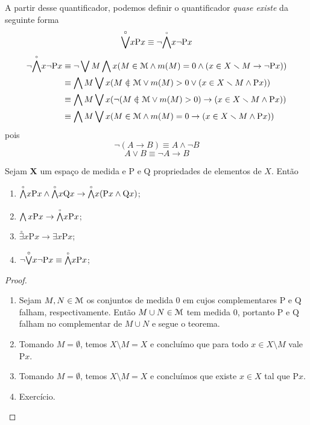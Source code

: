 A partir desse quantificador, podemos definir o quantificador \emph{quase existe} da seguinte forma
	\begin{equation*}
	\overset{\circ}{\exists}x \mathrm{P}x \equiv \neg \qforall x \neg \mathrm{P}x
	\end{equation*}
	\begin{align*}
	\neg\qforall x \neg\mathrm{P}x &\equiv \neg\exists M \forall x (M \in \mens \wedge \med(M)=0 \wedge (x \in X \setminus M \rightarrow \neg\mathrm{P}x)) \\	
	&\equiv \forall M \exists x (M \notin \mens \vee \med(M)>0 \vee (x \in X \setminus M \wedge \mathrm{P}x)) \\
	&\equiv \forall M \exists x (\neg(M \notin \mens \vee \med(M)>0) \rightarrow (x \in X \setminus M \wedge \mathrm{P}x)) \\
	&\equiv \forall M \exists x (M \in \mens \wedge \med(M)=0 \rightarrow (x \in X \setminus M \wedge \mathrm{P}x)) \\
	\end{align*}
pois
	\begin{equation*}
	\neg(A \rightarrow B) \equiv A \wedge \neg B
	\end{equation*}
	\begin{equation*}
	A \vee B \equiv \neg A \rightarrow B
	\end{equation*}

\begin{proposition}
Sejam $\bm X$ um espaço de medida e $\mathrm{P}$ e $\mathrm{Q}$ propriedades de elementos de $X$. Então
	\begin{enumerate}
	\item $\qforall x \mathrm{P}x \wedge \qforall x \mathrm{Q}x \rightarrow \qforall x (\mathrm{P}x \wedge \mathrm{Q}x)$;
	\item $\forall x \mathrm{P}x \rightarrow \qforall x \mathrm{P}x$;
	\item $\overset{\circ}{\exists} x \mathrm{P}x \rightarrow \exists x \mathrm{P}x$;
	\item $\neg \overset{\circ}{\exists}x \neg\mathrm{P}x \equiv \qforall x \mathrm{P}x$;
	\end{enumerate}
\end{proposition}
\begin{proof}
	\begin{enumerate}
	\item Sejam $M,N \in \mathcal{M}$ os conjuntos de medida $0$ em cujos complementares $\mathrm{P}$ e $\mathrm{Q}$ falham, respectivamente. Então $M \cup N \in \mathcal{M}$ tem medida $0$, portanto $\mathrm{P}$ e $\mathrm{Q}$ falham no complementar de $M \cup N$ e segue o teorema.
	
	\item Tomando $M=\emptyset$, temos $X \setminus M = X$ e concluímo que para todo $x \in X \setminus M$ vale $\mathrm{P}x$.
	
	\item Tomando $M=\emptyset$, temos $X \setminus M = X$ e concluímos que existe $x \in X$ tal que $\mathrm{P}x$.
	
	\item Exercício.
	\end{enumerate}
\end{proof}

